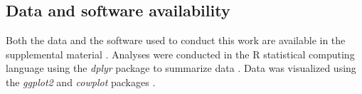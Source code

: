 


\subsection{Data and software availability}

Both the data and the software used to conduct this work are available in the supplemental material \citep{fergusonFergusonAJReplayingEvolution2023}.
Analyses were conducted in the R statistical computing language \citep{r_core_team_r_v4} using the \textit{dplyr} package to summarize data \citep{wickhamDplyrGrammarData2022}.
Data was visualized using the \textit{ggplot2} and \textit{cowplot} packages \citep{R-ggplot2, R-cowplot}.